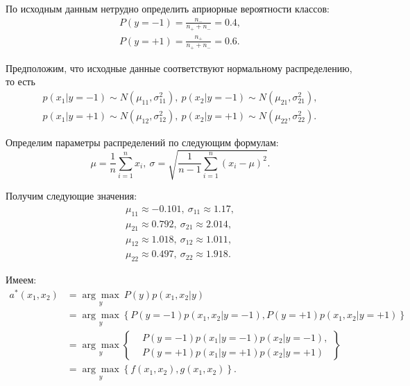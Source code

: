 \documentclass[14pt,a4paper]{article}
\begin{document}
    По исходным данным нетрудно определить априорные вероятности классов:
    \[
    	\begin{gathered}
    		P(y = -1) = \frac{n_{-}}{n_{+} + n_{-}} = 0.4, \\
    		P(y = +1) = \frac{n_{+}}{n_{+} + n_{-}} = 0.6.
    	\end{gathered}
    \]
    
    Предположим, что исходные данные соответствуют нормальному распределению, то есть
    \[
    	\begin{gathered}
    		p(x_1 | y = -1) \sim N(\mu_{11}, \sigma_{11}^2), \ p(x_2 | y = -1) \sim N(\mu_{21}, \sigma_{21}^2), \\
    		p(x_1 | y = +1) \sim N(\mu_{12}, \sigma_{12}^2), \ p(x_2 | y = +1) \sim N(\mu_{22}, \sigma_{22}^2).
    	\end{gathered}
    \]
    
    Определим параметры распределений по следующим формулам:
    \[
    	\mu = \frac{1}{n} \sum_{i = 1}^{n} x_i, \ \sigma = \sqrt{\frac{1}{n - 1} \sum_{i = 1}^{n} (x_i - \mu)^2}.
    \]
    
    Получим следующие значения:
    \[
    	\begin{gathered}
    		\mu_{11} \approx -0.101, \ \sigma_{11} \approx 1.17, \\
    		\mu_{21} \approx 0.792, \ \sigma_{21} \approx 2.014, \\
    		\mu_{12} \approx 1.018, \ \sigma_{12} \approx 1.011, \\
    		\mu_{22} \approx 0.497, \ \sigma_{22} \approx 1.918.
    	\end{gathered}
    \]
    
    Имеем:
    \[
    	\begin{aligned}
    		a^*(x_1, x_2) &= \underset{y}{\arg\!\max} \ P(y) p(x_1, x_2 | y) \\
    		&= \underset{y}{\arg\!\max} \left\{ P(y = -1) p(x_1, x_2 | y = -1), P(y = +1) p(x_1, x_2 | y = +1) \right\} \\
    		&=\underset{y}{\arg\!\max} 
    		\left\{
    		\begin{aligned}
    			&P(y = -1) p(x_1 | y = -1) p(x_2 | y = -1), \\
    			&P(y = +1) p(x_1 | y = +1) p(x_2 | y = +1)
    		\end{aligned}
    		\right\} \\
    		&= \underset{y}{\arg\!\max} \left\{ f(x_1, x_2), g(x_1, x_2) \right\}.
    	\end{aligned}
    \]
    
\end{document}
